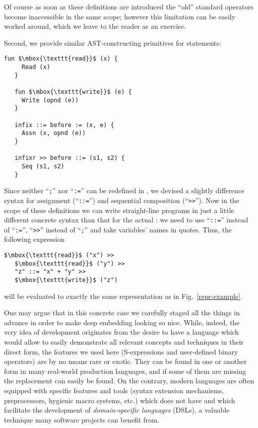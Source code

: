 Of course as soon as these definitions are introduced the ``old'' standard operators become inaccessible in
the same scope; however this limitation can be easily worked around, which we leave to the reader as an exercise.

Second, we provide similar AST-constructing primitives for statements:

\begin{lstlisting}[mathescape=true]
   fun $\mbox{\texttt{read}}$ (x) {
     Read (x)
   }

   fun $\mbox{\texttt{write}}$ (e) {
     Write (opnd (e))
   }

   infix ::= before := (x, e) {
     Assn (x, opnd (e))
   }

   infixr >> before ::= (s1, s2) {
     Seq (s1, s2)
   }
\end{lstlisting}

Since neither ``\lstinline|;|'' nor ``\lstinline|:=|'' can be redefined in \lama, we devised a slightly difference
syntax for assignment (``\lstinline|::=|'') and sequential composition (``\lstinline|>>|''). Now in the scope of
these definitions we can write straight-line programs in just a little different concrete syntax than that for
the actual \lama: we need to use ``\lstinline|::=|'' instead of ``\lstinline|:=|'', ``\lstinline|>>|'' instead
of ``\lstinline|;|'' and take variables' names in quotes. Thus, the following \lama expression

\begin{lstlisting}[mathescape=true]
   $\mbox{\texttt{read}}$ ("x") >>
   $\mbox{\texttt{read}}$ ("y") >>
   "z" ::= "x" + "y" >>
   $\mbox{\texttt{write}}$ ("z")
\end{lstlisting}

will be evaluated to exactly the same representation as in Fig.~\ref{repr-example}.

One may argue that in this concrete case we carefully staged all the things in advance in order to make deep embedding
looking so nice. While, indeed, the very idea of \lama development originates from the desire to have a
language which would allow to easily demonstrate all relevant concepts and techniques in their direct form, the
features we used here (S-expressions and user-defined binary operators) are by no means rare or exotic.
They can be found in one or another form in many real-world production languages, and if some of them are missing the
replacement can easily be found. On the contrary, modern languages are often equipped with specific features and
tools (syntax extension mechanisms, preprocessors, hygienic macro systems, etc.) which \lama does not have and which facilitate
the development of \emph{domain-specific languages} (DSLs), a valuable technique many software projects can benefit from.

